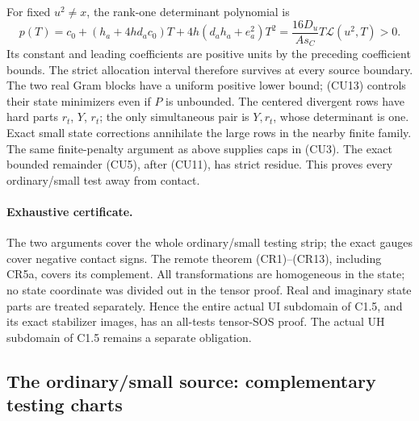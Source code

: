 For fixed $u^2\ne x$, the rank-one determinant polynomial is
\[
 p(T)=c_0+(h_a+4hd_ac_0)T+4h(d_ah_a+e_a^2)T^2
      =\frac{16D_u}{As_C}T\mathcal L(u^2,T)>0.
\]
Its constant and leading coefficients are positive units by the
preceding coefficient bounds. The strict allocation interval
therefore survives at every source boundary. The two real Gram
blocks have a uniform positive lower bound; (CU13) controls their
state minimizers even if $P$ is unbounded. The centered divergent
rows have hard parts $r_t$, $Y$, $r_t$; the only simultaneous pair
is $Y,r_t$, whose determinant is one. Exact small state corrections
annihilate the large rows in the nearby finite family. The same
finite-penalty argument as above supplies caps in (CU3). The exact
bounded remainder (CU5), after (CU11), has strict residue.
This proves every ordinary/small test away from contact.

\paragraph{Exhaustive certificate.}
The two arguments cover the whole ordinary/small testing strip;
the exact gauges cover negative contact signs. The remote theorem
(CR1)--(CR13), including CR5a, covers its complement.
All transformations are homogeneous in the state; no state coordinate
was divided out in the tensor proof. Real and imaginary state parts
are treated separately. Hence the entire actual UI subdomain of C1.5,
and its exact stabilizer images, has an all-tests tensor-SOS proof.
The actual UH subdomain of C1.5 remains a separate obligation.



\subsection{The ordinary/small source: complementary testing charts}

\label{component:p013c226a79b3}

